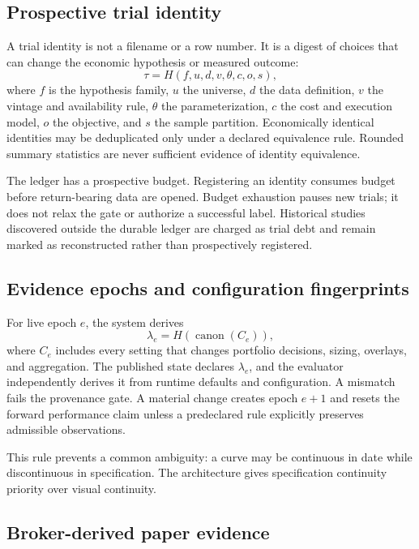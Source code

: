 \documentclass[11pt]{article}
\begin{document}
\subsection{Prospective trial identity}

A trial identity is not a filename or a row number. It is a digest of choices that can change the economic hypothesis or measured outcome:
\begin{equation}
  \tau = H(f,u,d,v,\theta,c,o,s),
\end{equation}
where $f$ is the hypothesis family, $u$ the universe, $d$ the data definition, $v$ the vintage and availability rule, $\theta$ the parameterization, $c$ the cost and execution model, $o$ the objective, and $s$ the sample partition. Economically identical identities may be deduplicated only under a declared equivalence rule. Rounded summary statistics are never sufficient evidence of identity equivalence.

The ledger has a prospective budget. Registering an identity consumes budget before return-bearing data are opened. Budget exhaustion pauses new trials; it does not relax the gate or authorize a successful label. Historical studies discovered outside the durable ledger are charged as trial debt and remain marked as reconstructed rather than prospectively registered.

\subsection{Evidence epochs and configuration fingerprints}

For live epoch $e$, the system derives
\begin{equation}
  \lambda_e = H(\operatorname{canon}(C_e)),
\end{equation}
where $C_e$ includes every setting that changes portfolio decisions, sizing, overlays, and aggregation. The published state declares $\lambda_e$, and the evaluator independently derives it from runtime defaults and configuration. A mismatch fails the provenance gate. A material change creates epoch $e+1$ and resets the forward performance claim unless a predeclared rule explicitly preserves admissible observations.

This rule prevents a common ambiguity: a curve may be continuous in date while discontinuous in specification. The architecture gives specification continuity priority over visual continuity.

\subsection{Broker-derived paper evidence}
\end{document}
